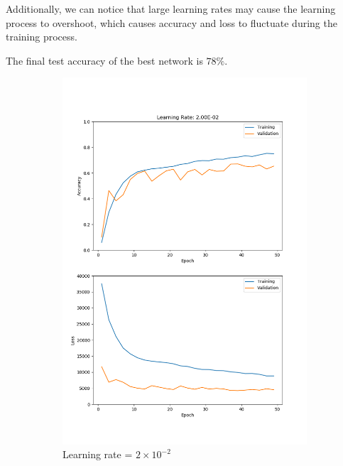 \documentclass[11pt]{article}
\begin{document}
Additionally, we can notice that large learning rates may cause the learning process to overshoot, which causes accuracy and loss to fluctuate during the training process.

The final test accuracy of the best network is $78\%$.

\begin{figure}[h!]
    \begin{subfigure}{.325\textwidth}
      \centering
      \includegraphics[width=.95\linewidth]{../results/q3_1_2_2E-02.png}
      \caption{Learning rate = $2\times10^{-2}$}
    \end{subfigure}
    \begin{subfigure}{.325\textwidth}
      \centering

\end{subfigure}
\end{figure}
\end{document}
